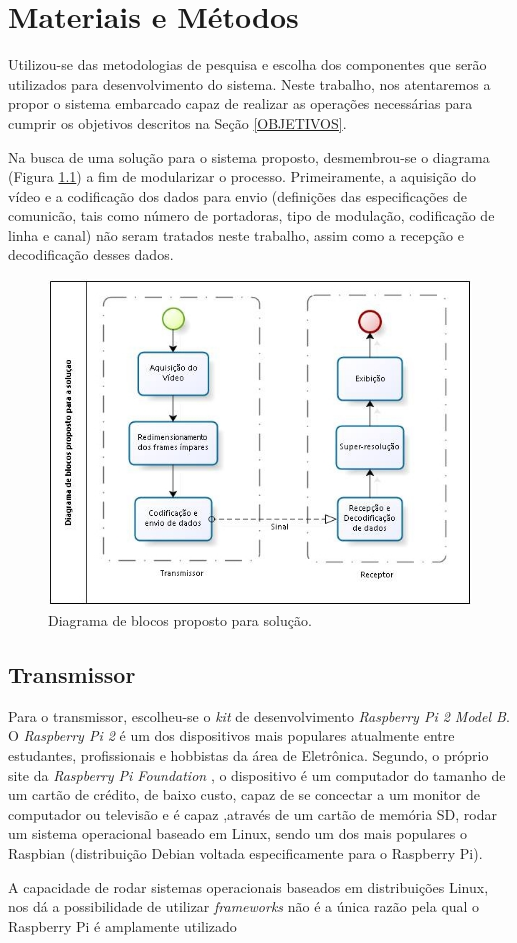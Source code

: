\chapter[Materiais e Métodos]{Materiais e Métodos}

Utilizou-se das metodologias de pesquisa e escolha dos componentes que serão utilizados para desenvolvimento do sistema. Neste trabalho, nos atentaremos a propor o sistema embarcado capaz de realizar as operações necessárias para cumprir os objetivos descritos na Seção \ref{OBJETIVOS}.

Na busca de uma solução para o sistema proposto, desmembrou-se o diagrama (Figura \ref{fig:blocos}) a fim de modularizar o processo. Primeiramente, a aquisição do vídeo e a codificação dos dados para envio (definições das especificações de comunicão, tais como número de portadoras, tipo de modulação, codificação de linha e canal) não seram tratados neste trabalho, assim como a recepção e decodificação desses dados. 


\begin{figure}[h]
	\centering
	\includegraphics[scale=.7]{figuras/diagrama_blocos_solucao.jpg}
	\caption{Diagrama de blocos proposto para solução.}
	\label{fig:blocos}
\end{figure}
\section{Transmissor}

Para o transmissor, escolheu-se o \textit{kit} de desenvolvimento \textit{Raspberry Pi 2 Model B}. O \textit{Raspberry Pi 2} é um dos dispositivos mais populares atualmente entre estudantes, profissionais e hobbistas da área de Eletrônica. Segundo, o próprio site da \textit{Raspberry Pi
Foundation} \cite{raspberryOrg}, o dispositivo é um computador do tamanho de um cartão de crédito, de baixo custo, capaz de se concectar a um monitor de computador ou televisão e é capaz ,através de um cartão de memória SD, rodar um sistema operacional baseado em Linux, sendo
um dos mais populares o Raspbian (distribuição Debian voltada especificamente para o
Raspberry Pi).

A capacidade de rodar sistemas operacionais baseados em distribuições Linux, nos dá a possibilidade de utilizar \textit{frameworks} não
é a única razão pela qual o Raspberry Pi é amplamente utilizado